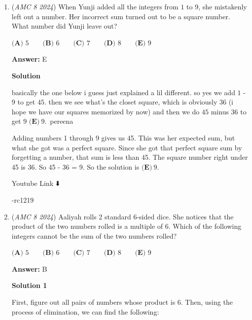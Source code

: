 \begin{enumerate}
 -SahanWijetunga

 Youtube Link ⬇️

 


 -rc1219

 Problem 3

 


	\item (\textit{AMC 8 2024}) When Yunji added all the integers from $1$ to $9$, she mistakenly left out a number. Her incorrect sum turned out to be a square number. What number did Yunji leave out?


 $\textbf{(A) } 5\qquad\textbf{(B) } 6\qquad\textbf{(C) } 7\qquad\textbf{(D) } 8\qquad\textbf{(E) } 9$

 \textbf{Answer: }E



\textbf{Solution}

basically the one below i guess just explained a lil different. so yes we add $1$ - $9$ to get $45$. then we see what’s the closet square, which is obviously $36$ (i hope we have our squares memorized by now) and then we do $45$ minus $36$ to get $9$ $\boxed{\textbf{(E)}\ 9}$.~pereena

 Adding numbers 1 through 9 gives us 45. This was her expected sum, but what she got was a perfect square. Since she got that perfect square sum by forgetting a number, that sum is less than 45. The square number right under 45 is 36. So 45 - 36 = 9. So the solution is $\boxed{\textbf{(E)}\ 9}$.

 Youtube Link ⬇️

 


 -rc1219

 


 


	\item (\textit{AMC 8 2024}) Aaliyah rolls 2 standard 6-sided dice. She notices that the product of the two numbers rolled is a multiple of $6$. Which of the following integers cannot be the sum of the two numbers rolled?


 $\textbf{(A) } 5\qquad\textbf{(B) } 6\qquad\textbf{(C) } 7\qquad\textbf{(D) } 8\qquad\textbf{(E) } 9$

 \textbf{Answer: }B



\textbf{Solution 1}

First, figure out all pairs of numbers whose product is 6. Then, using the process of elimination, we can find the following: 


\end{enumerate}
